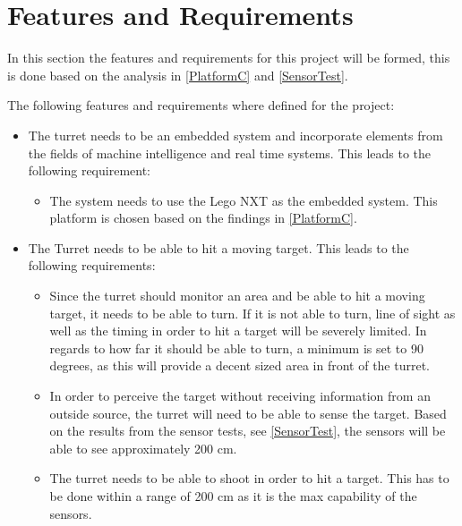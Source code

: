\section{Features and Requirements}\label{FeatAndReq}
In this section the features and requirements for this project will be formed,
this is done based on the analysis in \autoref{PlatformC} and
\autoref{SensorTest}.

The following features and requirements where defined for the project:
\begin{itemize}
  \item The turret needs to be an embedded system and incorporate elements from
  the fields of machine intelligence and real time systems. This leads to the
  following requirement:
  \begin{itemize}
    \item The system needs to use the Lego NXT as the embedded
    system. This platform is chosen based on the findings in
    \autoref{PlatformC}. 
  \end{itemize}
  \item The Turret needs to be able to hit a moving target. This leads to the
  following requirements:
  \begin{itemize}
    \item Since the turret should monitor an area and be able to hit a moving
    target, it needs to be able to turn. If it is not able to turn, line of
    sight as well as the timing in order to hit a target will be severely
    limited. In regards to how far it should be able to turn, a minimum is set
    to 90 degrees, as this will provide a decent sized area in front of the turret.
    \item In order to perceive the target without receiving information from an
    outside source, the turret will need to be able to sense the target. Based
    on the results from the sensor tests, see \autoref{SensorTest}, the sensors
    will be able to see approximately 200 cm.    
    \item The turret needs to be able to shoot in order to hit a
    target. This has to be done within a range of 200 cm as it is the max
    capability of the sensors. 
    

\end{itemize}
\end{itemize}
